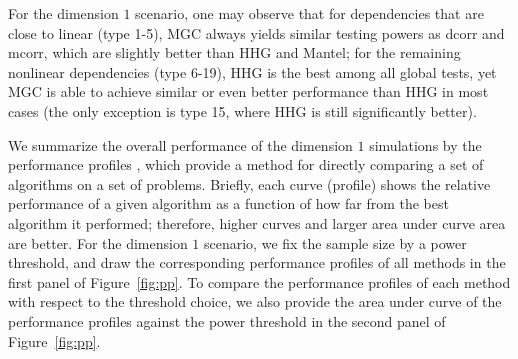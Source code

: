 \documentclass[11pt]{article}
\newcommand{\jv}[1]{{\color{red}{#1}}}
\begin{document}
\jv{please change all figs to png}


For the dimension $1$ scenario, one may observe that for dependencies that are close to linear (type 1-5), MGC always yields similar testing powers as dcorr and mcorr, which are slightly better than HHG and Mantel; for the remaining nonlinear dependencies (type 6-19), HHG is the best among all global tests, yet MGC is able to achieve similar or even better performance than HHG in most cases (the only exception is type 15, where HHG is still significantly better). 

We summarize the overall performance of the dimension $1$ simulations by the performance profiles \cite{DolanMore2002}, which provide a method for directly comparing a set of algorithms on a set of problems.  Briefly, each curve (profile) shows the relative performance of a given algorithm as a function of how far from the best algorithm it performed; therefore, higher curves and larger area under curve area are better. For the dimension $1$ scenario, we fix the sample size by a power threshold, and draw the corresponding performance profiles of all methods in the first panel of Figure~\ref{fig:pp}. To compare the performance profiles of each method with respect to the threshold choice, we also provide the area under curve of the performance profiles against the power threshold in the second panel of Figure~\ref{fig:pp}.
\end{document}
